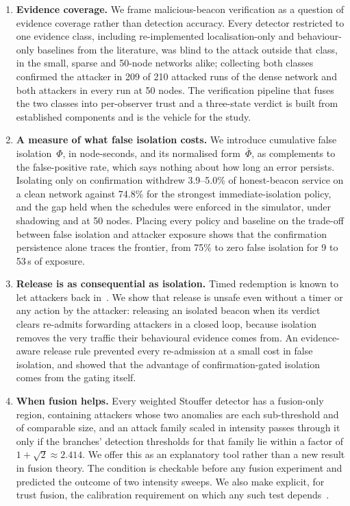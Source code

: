 \begin{enumerate}
\item \textbf{Evidence coverage.} We frame malicious-beacon
      verification as a question of evidence coverage rather than detection
      accuracy. Every detector restricted to one evidence class, including
      re-implemented localisation-only and behaviour-only baselines from the
      literature, was blind to the attack outside that class, in the small,
      sparse and 50-node networks alike; collecting both classes confirmed
      the attacker in 209 of 210 attacked runs of the dense network and
      both attackers in every run at 50 nodes. The verification pipeline that
      fuses the two classes into per-observer trust and a three-state verdict
      is built from established components and is the vehicle for
      the study.

\item \textbf{A measure of what false isolation costs.} We introduce
      cumulative false isolation~$\Phi$, in node-seconds, and its normalised
      form~$\bar\Phi$, as complements to the false-positive rate, which says
      nothing about how long an error persists. Isolating only on
      confirmation withdrew 3.9--5.0\% of honest-beacon service on a clean
      network against 74.8\% for the strongest immediate-isolation policy,
      and the gap held when the schedules were enforced in the simulator,
      under shadowing and at 50 nodes. Placing every policy and baseline
      on the trade-off between false isolation and attacker exposure shows
      that the confirmation persistence alone traces the frontier, from
      75\% to zero false isolation for 9 to 53\,s of exposure.

\item \textbf{Release is as consequential as isolation.} Timed
      redemption is known to let attackers back in~\cite{bansal2003ocean,sen2010survey}.
      We show that release is unsafe even without a timer or any action by
      the attacker: releasing an isolated beacon when its verdict clears
      re-admits forwarding attackers in a closed loop, because isolation
      removes the very traffic their behavioural evidence comes from. An evidence-aware release rule
      prevented every re-admission at a small cost in false isolation, and
      showed that the advantage of confirmation-gated isolation comes from
      the gating itself.

\item \textbf{When fusion helps.} Every weighted Stouffer
      detector has a fusion-only region, containing attackers whose two anomalies are
      each sub-threshold and of comparable size, and an attack family scaled
      in intensity passes through it only if the branches' detection
      thresholds for that family lie within a factor of
      $1+\sqrt{2}\approx 2.414$. We offer this as an explanatory tool rather
      than a new result in fusion theory. The condition is checkable before any
      fusion experiment and predicted the outcome of two intensity sweeps.
      We also make explicit, for trust fusion, the calibration requirement on
      which any such test depends~\cite{stouffer1949,whitlock2005weighted}.


\end{enumerate}
